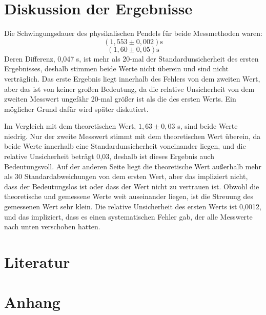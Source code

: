 \documentclass[11pt,a4paper]{article} %
\begin{document}
\section{Diskussion der Ergebnisse}
Die Schwingungsdauer des physikalischen Pendels für beide Messmethoden waren:
$$(1,553 \pm 0,002) \textrm{s}$$
$$(1,60 \pm 0,05) \textrm{s}$$
Deren Differenz, 0,047 s, ist mehr als 20-mal der Standardunsicherheit des ersten Ergebnisses, deshalb stimmen beide Werte nicht überein und sind nicht verträglich. Das erste Ergebnis liegt innerhalb des Fehlers von dem zweiten Wert, aber das ist von keiner großen Bedeutung, da die relative Unsicherheit von dem zweiten Messwert ungefähr 20-mal größer ist als die des ersten Werts. Ein möglicher Grund dafür wird später diskutiert. 

Im Vergleich mit dem theoretischen Wert, $1,63 \pm 0,03$ s, sind beide Werte niedrig. Nur der zweite Messwert stimmt mit dem theoretischen Wert überein, da beide Werte innerhalb eine Standardunsicherheit voneinander liegen, und die relative Unsicherheit beträgt 0,03, deshalb ist dieses Ergebnis auch Bedeutungsvoll. Auf der anderen Seite liegt die theoretische Wert außerhalb mehr als 30 Standardabweichungen von dem ersten Wert, aber das impliziert nicht, dass der Bedeutungslos ist oder dass der Wert nicht zu vertrauen ist. Obwohl die theoretische und gemessene Werte weit auseinander liegen, ist die Streuung des gemessenen Wert sehr klein. Die relative Unsicherheit des ersten Werts ist 0,0012, und das impliziert, dass es einen systematischen Fehler gab, der alle Messwerte nach unten verschoben hatten. 

\section{Literatur}

\section{Anhang}
\end{document}
